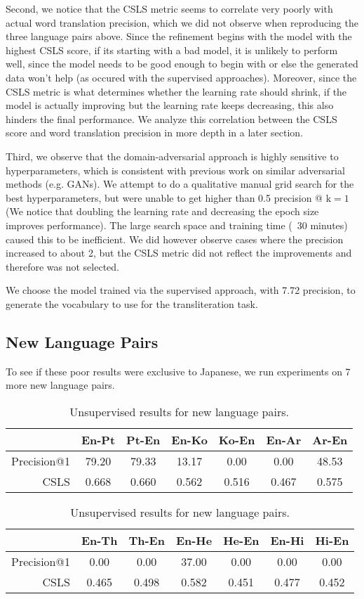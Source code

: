\documentclass{article}
\begin{document}
Second, we notice that the CSLS metric seems to correlate very poorly
with actual word translation precision, which we did not observe when reproducing
the three language pairs above. Since the refinement begins with the model with
the highest CSLS score, if its starting with a bad model, it is unlikely to
perform well, since the model needs to be good enough to begin with or else the
generated data won't help (as occured with the supervised approaches). Moreover,
since the CSLS metric is what determines whether the learning rate should shrink,
if the model is actually improving but the learning rate keeps decreasing, this
also hinders the final performance. We analyze this correlation between the CSLS
score and word translation precision in more depth in a later section.

Third, we observe that the domain-adversarial approach is highly sensitive to
hyperparameters, which is consistent with previous work on similar adversarial
methods (e.g. GANs). We attempt to do a qualitative manual grid search for
the best hyperparameters, but were unable to get higher than 0.5 precision @
$\text{k}=1$ (We notice that doubling the learning rate and decreasing the epoch
size improves performance). The large search space and training time (~30 minutes)
caused this to be inefficient. We did however observe cases where the precision
increased to about 2, but the CSLS metric did not reflect the improvements and
therefore was not selected.

We choose the model trained via the supervised approach, with 7.72 precision, to
generate the vocabulary to use for the transliteration task.

\subsection*{New Language Pairs}

To see if these poor results were exclusive to Japanese, we run experiments
on 7 more new language pairs.

\begin{table}[h]
  \centering
  \begin{tabular}{||r|cc|cc|cc||}
    \hline
    & En-Pt & Pt-En & En-Ko & Ko-En & En-Ar & Ar-En \\
    \hline
    Precision@1 & 79.20 & 79.33 & 13.17 &  0.00 &  0.00 & 48.53 \\
    CSLS        & 0.668 & 0.660 & 0.562 & 0.516 & 0.467 & 0.575 \\
    \hline
  \end{tabular}
  \begin{tabular}{||r|cc|cc|cc||}
    \hline
    & En-Th & Th-En & En-He & He-En & En-Hi & Hi-En \\
    \hline
    Precision@1 &  0.00 &  0.00 & 37.00 &  0.00 &  0.00 &  0.00 \\
    CSLS        & 0.465 & 0.498 & 0.582 & 0.451 & 0.477 & 0.452 \\
    \hline
  \end{tabular}
  \caption{Unsupervised results for new language pairs.}
\end{table}
\end{document}
